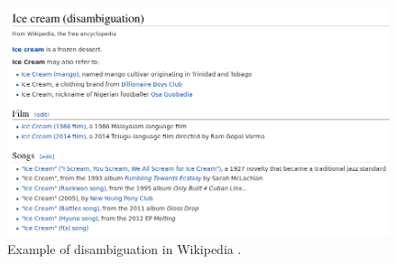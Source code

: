 \begin{figure}[h]
\centering
\includegraphics[width=\textwidth]{Chapters/Introduction/Ice_cream_disambiguation}
\caption{Example of disambiguation in Wikipedia \cite{wiki:icecreamdisambiguation}.}
\label{fig:disambiguation_example}
\end{figure}